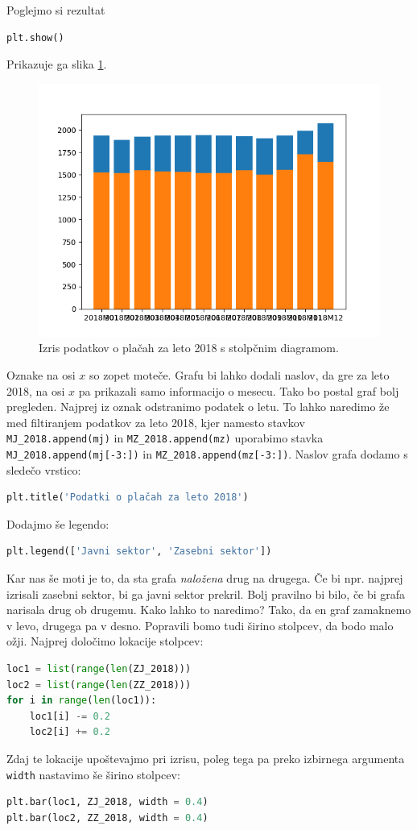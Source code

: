 Poglejmo si rezultat
\begin{lstlisting}[language=Python]
plt.show()
\end{lstlisting}
Prikazuje ga slika \ref{img:plt6}.
\begin{figure}
    \includegraphics[width=\linewidth]{img/plt6.png}
    \caption{Izris podatkov o plačah za leto 2018 s stolpčnim diagramom.}
    \label{img:plt6}
\end{figure}
Oznake na osi $x$ so zopet moteče. Grafu bi lahko dodali naslov, da gre za leto 2018, na osi $x$ pa prikazali samo informacijo o mesecu. Tako bo postal graf bolj pregleden. Najprej iz oznak odstranimo podatek o letu. To lahko naredimo že med filtiranjem podatkov za leto 2018, kjer namesto stavkov \texttt{MJ\_2018.append(mj)} in \texttt{MZ\_2018.append(mz)} uporabimo stavka \texttt{MJ\_2018.append(mj[-3:])} in \texttt{MZ\_2018.append(mz[-3:])}. Naslov grafa dodamo s sledečo vrstico:
\begin{lstlisting}[language=Python]
plt.title('Podatki o plačah za leto 2018')
\end{lstlisting}
Dodajmo še legendo:
\begin{lstlisting}[language=Python, showstringspaces=false]
plt.legend(['Javni sektor', 'Zasebni sektor'])
\end{lstlisting}

Kar nas še moti je to, da sta grafa \emph{naložena} drug na drugega. Če bi npr. najprej izrisali zasebni sektor, bi ga javni sektor prekril. Bolj pravilno bi bilo, če bi grafa narisala drug ob drugemu. Kako lahko to naredimo? Tako, da en graf zamaknemo v levo, drugega pa v desno. Popravili bomo tudi širino stolpcev, da bodo malo ožji. Najprej določimo lokacije stolpcev:
\begin{lstlisting}[language=Python]
loc1 = list(range(len(ZJ_2018)))
loc2 = list(range(len(ZZ_2018)))
for i in range(len(loc1)):
    loc1[i] -= 0.2
    loc2[i] += 0.2
\end{lstlisting}
Zdaj te lokacije upoštevajmo pri izrisu, poleg tega pa preko izbirnega argumenta \texttt{width} nastavimo še širino stolpcev:
\begin{lstlisting}[language=Python]
plt.bar(loc1, ZJ_2018, width = 0.4)
plt.bar(loc2, ZZ_2018, width = 0.4)
\end{lstlisting}

